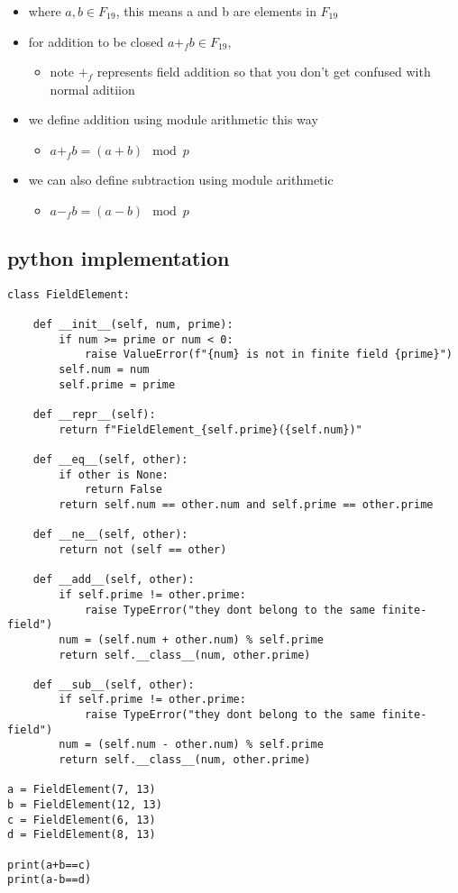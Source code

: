 \documentclass[11pt]{article}
\begin{document}
\begin{itemize}
\item where \(a,b \in F_{19}\), this means a and b are elements in \(F_{19}\)
\item for addition to be closed \(a +_f b \in F_{19}\),
\begin{itemize}
\item note \(+_f\) represents field addition so that you don't get confused with normal aditiion
\end{itemize}
\item we define addition using module arithmetic this way
\begin{itemize}
\item \(a +_f b = (a + b) \mod p\)
\end{itemize}
\item we can also define subtraction using module arithmetic
\begin{itemize}
\item \(a -_f b = (a - b) \mod p\)
\end{itemize}
\end{itemize}

\subsection{python implementation}
\label{sec:org1281ef3}

\begin{verbatim}
class FieldElement:

    def __init__(self, num, prime):
        if num >= prime or num < 0:
            raise ValueError(f"{num} is not in finite field {prime}")
        self.num = num
        self.prime = prime

    def __repr__(self):
        return f"FieldElement_{self.prime}({self.num})"

    def __eq__(self, other):
        if other is None:
            return False
        return self.num == other.num and self.prime == other.prime

    def __ne__(self, other):
        return not (self == other)

    def __add__(self, other):
        if self.prime != other.prime:
            raise TypeError("they dont belong to the same finite-field")
        num = (self.num + other.num) % self.prime
        return self.__class__(num, other.prime)

    def __sub__(self, other):
        if self.prime != other.prime:
            raise TypeError("they dont belong to the same finite-field")
        num = (self.num - other.num) % self.prime
        return self.__class__(num, other.prime)

a = FieldElement(7, 13)
b = FieldElement(12, 13)
c = FieldElement(6, 13)
d = FieldElement(8, 13)

print(a+b==c)
print(a-b==d)
\end{verbatim}
\end{document}
